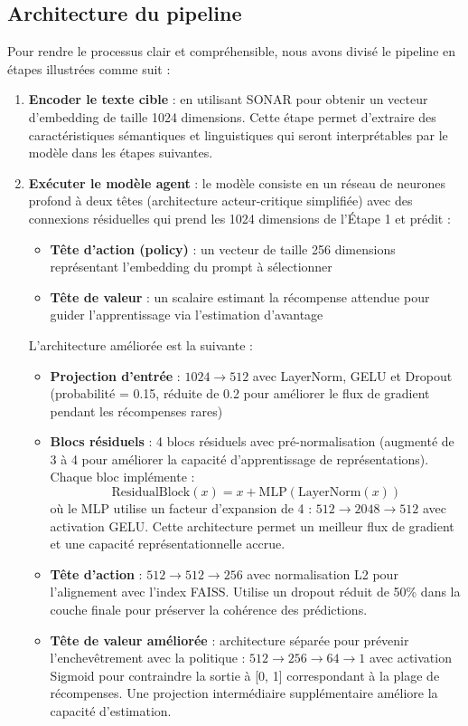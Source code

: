 \subsection{Architecture du pipeline}
Pour rendre le processus clair et compréhensible, nous avons divisé le pipeline en étapes illustrées comme suit : 

\begin{enumerate}
    \item \textbf{Encoder le texte cible} : en utilisant SONAR pour obtenir un vecteur d'embedding de taille 1024 dimensions. Cette étape permet d'extraire des caractéristiques sémantiques et linguistiques qui seront interprétables par le modèle dans les étapes suivantes.

    \item \textbf{Exécuter le modèle agent} : le modèle consiste en un réseau de neurones profond à deux têtes (architecture acteur-critique simplifiée) avec des connexions résiduelles qui prend les 1024 dimensions de l'Étape 1 et prédit :
    \begin{itemize}
        \item \textbf{Tête d'action (policy)} : un vecteur de taille 256 dimensions représentant l'embedding du prompt à sélectionner
        \item \textbf{Tête de valeur} : un scalaire estimant la récompense attendue pour guider l'apprentissage via l'estimation d'avantage
    \end{itemize}
    
    L'architecture améliorée est la suivante :
    \begin{itemize}
        \item \textbf{Projection d'entrée} : $1024 \rightarrow 512$ avec LayerNorm, GELU et Dropout (probabilité = 0.15, réduite de 0.2 pour améliorer le flux de gradient pendant les récompenses rares)
        \item \textbf{Blocs résiduels} : 4 blocs résiduels avec pré-normalisation (augmenté de 3 à 4 pour améliorer la capacité d'apprentissage de représentations). Chaque bloc implémente :
        \[
        \text{ResidualBlock}(x) = x + \text{MLP}(\text{LayerNorm}(x))
        \]
        où le MLP utilise un facteur d'expansion de 4 : $512 \rightarrow 2048 \rightarrow 512$ avec activation GELU. Cette architecture permet un meilleur flux de gradient et une capacité représentationnelle accrue.
        \item \textbf{Tête d'action} : $512 \rightarrow 512 \rightarrow 256$ avec normalisation L2 pour l'alignement avec l'index FAISS. Utilise un dropout réduit de 50\% dans la couche finale pour préserver la cohérence des prédictions.
        \item \textbf{Tête de valeur améliorée} : architecture séparée pour prévenir l'enchevêtrement avec la politique : $512 \rightarrow 256 \rightarrow 64 \rightarrow 1$ avec activation Sigmoid pour contraindre la sortie à [0, 1] correspondant à la plage de récompenses. Une projection intermédiaire supplémentaire améliore la capacité d'estimation.
    \end{itemize}
    

\end{enumerate}
